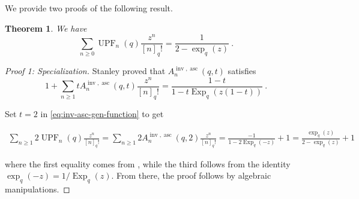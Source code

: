 \documentclass{amsart}
\DeclareMathOperator{\asc}{asc}
\DeclareMathOperator{\inv}{inv}
\DeclareMathOperator{\UPF}{UPF} %
\DeclareMathOperator{\Exp}{Exp}
\newtheorem{theorem}{Theorem}[section]
\theoremstyle{definition}
\begin{document}
We provide two proofs of the following result.
\begin{theorem}\label{eq:upf-inv-gen-func}
    We have
      \[\sum_{n\geq 0} \UPF_{n}(q)\frac{z^n}{[n]_q!}=\frac{1}{2-\exp_{q}(z)} \ .\]
\end{theorem}
\begin{proof}[Proof 1: Specialization]
Stanley \cite[Corollary 3.6]{stanley1976binomial} proved that $A_n^{\inv,\asc}(q,t)$ satisfies
\begin{equation}\label{eq:inv-asc-gen-function}
    1+\sum_{n\geq 1}t A_{n}^{\inv,\asc}(q,t)\frac{z^n}{[n]_q!}=\frac{1-t}{1-t\Exp_q(z(1-t))} \ .
\end{equation}

    Set $t=2$ in \eqref{eq:inv-asc-gen-function} 
    to get
    
    
   \begin{align*}
        \sum_{n\geq 1}2\UPF_n(q)\frac{z^n}{[n]_q!}=\sum_{n\geq 1}2A_{n}^{\inv,\asc}(q,2)\frac{z^n}{[n]_q!}=\frac{-1}{1-2\Exp_q(-z)}+1=\frac{\exp_q(z)}{2-\exp_q(z)}+1
    \end{align*}

    
where the first equality comes from , while the third follows from the identity $\exp_q(-z)=1/\Exp_q(z)$. From there, the proof follows by algebraic manipulations.
\end{proof}
\end{document}
